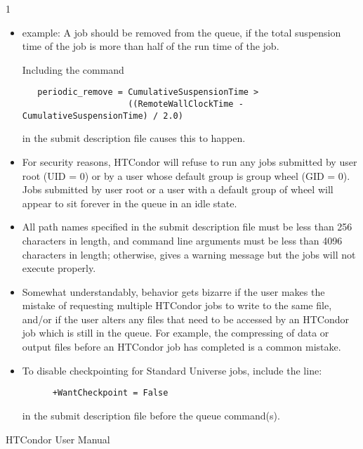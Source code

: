 \begin{ManPage}{\label{man-condor-submit}}{1}
\begin{itemize}
\item{ example:}
A job should be removed from the queue,
if the total suspension time of the job
is more than half of the run time of the job.

Including the command
\footnotesize
\begin{verbatim}
   periodic_remove = CumulativeSuspensionTime > 
                     ((RemoteWallClockTime - CumulativeSuspensionTime) / 2.0)
\end{verbatim}
\normalsize
in the submit description file causes this to happen.

\end{itemize} 


\GenRem
\begin{itemize}

\item For security reasons, HTCondor will refuse to run any jobs submitted
by user root (UID = 0) or by a user whose default group is group wheel
(GID = 0). Jobs submitted by user root or a user with a default group of
wheel will appear to sit forever in the queue in an idle state. 

\item All path names specified in the submit description file must be
less than 256 characters in length, and command line arguments must be
less than 4096 characters in length; otherwise,  gives a
warning message but the jobs will not execute properly. 

\item Somewhat understandably, behavior gets bizarre if the user makes
the mistake of requesting multiple HTCondor jobs to write to the
same file, and/or if the user alters any files that need to be accessed
by an HTCondor job which is still in the queue.
For example, the compressing of data or
output files before an HTCondor job has completed is a common mistake.

\item To disable checkpointing for Standard Universe jobs, include the
line:
\begin{verbatim}
      +WantCheckpoint = False
\end{verbatim}
in the submit description file before the queue command(s).
\end{itemize}

\SeeAlso
HTCondor User Manual

\end{ManPage}

